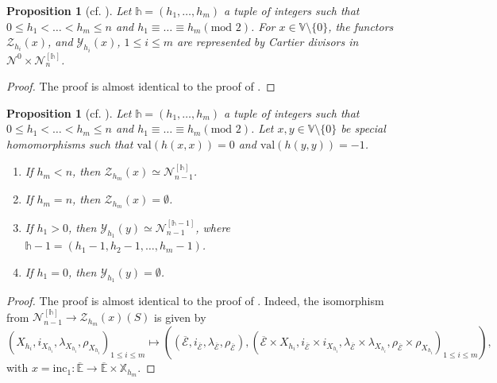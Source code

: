 \documentclass[11pt,oneside]{amsart}
\newcommand{\val}{{\mathrm{val}}}
\theoremstyle{plain}
\newtheorem{proposition}[theorem]{Proposition}
\theoremstyle{definition}
\theoremstyle{remark}
\newcommand{\tx}[1]{\text{#1}}
\newcommand{\BE}{{\mathbb E}}
\newcommand{\BV}{{\mathbb V}}
\newcommand{\BX}{{\mathbb X}}
\newcommand{\CE}{{\mathcal E}}
\newcommand{\CN}{{\mathcal N}}
\newcommand{\CY}{{\mathcal Y}}
\newcommand{\CZ}{{\mathcal Z}}
\numberwithin{equation}{section}
\begin{document}
	\begin{proposition}[cf. {\cite[Proposition 5.9]{cho2018basic}}] Let $\mathds{h}=(h_1,\dots,h_m)$ a tuple of integers such that $0\leq h_1<\dots<h_m \leq n$ and $h_1 \equiv \dots \equiv h_m (\tx{mod } 2)$. For $x \in \BV \setminus \lbrace 0 \rbrace$, the functors $\CZ_{h_i}(x)$, and $\CY_{h_i}(x)$, $1 \leq i \leq m$ are represented by Cartier divisors in $\CN^0 \times \CN_n^{[\mathds{h}]}$.
	\end{proposition}
	\begin{proof}
		The proof is almost identical to the proof of \cite[Proposition 5.9]{cho2018basic}.
	\end{proof}
	
	\begin{proposition}[cf. {\cite[Proposition 5.10]{cho2018basic}}] \label{proposition3.8} Let $\mathds{h}=(h_1,\dots,h_m)$ a tuple of integers such that $0\leq h_1<\dots<h_m \leq n$ and $h_1 \equiv \dots \equiv h_m (\tx{mod } 2)$. Let $x,y \in \BV \setminus \lbrace 0 \rbrace$ be special homomorphisms such that $\val(h(x,x))=0$ and $\val(h(y,y))=-1$.
		\begin{enumerate}
			\item If $h_m<n$, then $\CZ_{h_m}(x) \simeq \CN_{n-1}^{[\mathds{h}]}$.
			\item If $h_m=n$, then $\CZ_{h_m}(x)= \emptyset$.
			\item If $h_1>0$, then $\CY_{h_1}(y) \simeq \CN_{n-1}^{[\mathds{h}-1]}$, where $\mathds{h}-1=(h_1-1,h_2-1,\dots,h_m-1)$.
			\item If $h_1=0$, then $\CY_{h_1}(y)=\emptyset$.
		\end{enumerate}
	\end{proposition}
	\begin{proof} The proof is almost identical to the proof of \cite[Proposition 5.10]{cho2018basic}. Indeed, the isomorphism from $\CN_{n-1}^{[\mathds{h}]} \rightarrow \CZ_{h_m}(x)(S)$ is given by
		\begin{equation*}
			(X_{h_i},i_{X_{h_i}},\lambda_{X_{h_i}},\rho_{X_{h_i}})_{1 \leq i \leq m} \mapsto ((\overline{\CE},i_{\overline{\CE}},\lambda_{\overline{\CE}},\rho_{\overline{\CE}}),(\overline{\CE} \times X_{h_i},i_{\overline{\CE}} \times i_{X_{h_i}},\lambda_{\overline{\CE}}\times \lambda_{X_{h_i}},\rho_{\overline{\CE}}\times \rho_{X_{h_i}})_{1 \leq i \leq m}),
		\end{equation*}
		with $x=\tx{inc}_1: \overline{\BE} \rightarrow \overline{\BE}\times \BX_{h_m}$.
	\end{proof}
	
\end{document}
